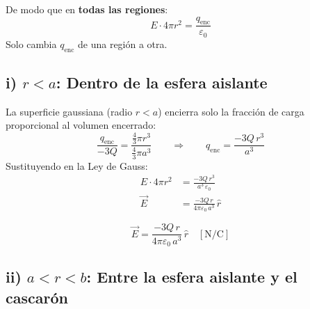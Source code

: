 \documentclass[12pt,letterpaper]{article}
\begin{document}
De modo que en \textbf{todas las regiones}:
\[
    E \cdot 4\pi r^2 = \frac{q_\text{enc}}{\varepsilon_0}
\]
Solo cambia $q_\text{enc}$ de una regi\'on a otra.

\bigskip

\subsection*{i) $r < a$: Dentro de la esfera aislante}

\noindent
\begin{minipage}[c]{0.30\textwidth}
\centering
{}
\end{minipage}%
\hfill
\begin{minipage}[c]{0.67\textwidth}
La superficie gaussiana (radio $r < a$) encierra solo la fracci\'on
de carga proporcional al volumen encerrado:
\[
    \frac{q_\text{enc}}{-3Q}
    = \frac{\tfrac{4}{3}\pi r^3}{\tfrac{4}{3}\pi a^3}
    \qquad\Rightarrow\qquad
    q_\text{enc} = \frac{-3Q\,r^3}{a^3}
\]
Sustituyendo en la Ley de Gauss:
\begin{align*}
    E \cdot 4\pi r^2 &= \frac{-3Q\,r^3}{a^3\,\varepsilon_0} \\[6pt]
    \vec{E}         &= \frac{-3Q\,r}{4\pi\varepsilon_0\,a^3}\,\hat{r}
\end{align*}
\end{minipage}

\[
    \boxed{\vec{E} = \frac{-3Q\,r}{4\pi\varepsilon_0\,a^3}\,\hat{r} \quad [\text{N/C}]}
\]

\bigskip

\subsection*{ii) $a < r < b$: Entre la esfera aislante y el cascar\'on}
\end{document}
